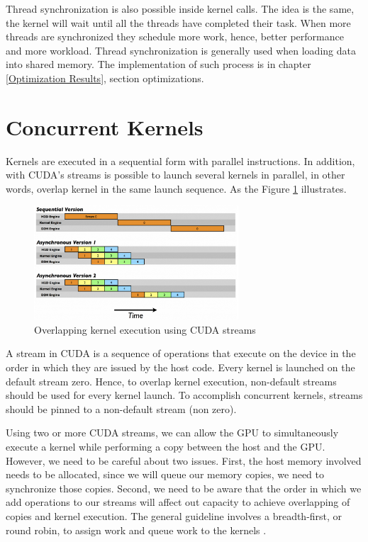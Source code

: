 Thread synchronization is also possible inside kernel calls. The idea is the same, the kernel will wait until all the threads have completed their task. When more threads are synchronized they schedule more work, hence, better performance and more workload. Thread synchronization is generally used when loading data into shared memory. The implementation of such process is in chapter \ref{Optimization Results}, section optimizations. 

\section{Concurrent Kernels}

Kernels are executed in a sequential form with parallel instructions. In addition, with CUDA's streams is possible to launch several kernels in parallel, in other words, overlap kernel in the same launch sequence. As the Figure \ref{fig:streams} illustrates.

\begin{figure}[htbp]
	\centering
		\includegraphics[width=0.68\textwidth]{Figures/streams.png}
		\smallskip
	\caption[Concurrent Kernels]{Overlapping kernel execution using CUDA streams}
	\label{fig:streams}
\end{figure}

A stream in CUDA is a sequence of operations that execute on the device in the order in which they are issued by the host code. Every kernel is launched on the default stream zero. Hence, to overlap kernel execution, non-default streams should be used for every kernel launch. To accomplish concurrent kernels, streams should be pinned to a non-default stream (non zero)\cite{hwu}. 

Using two or more CUDA streams, we can allow the GPU to simultaneously execute a kernel while performing a copy between the host and the GPU. However, we need to be careful about two issues. First, the host memory involved needs to be allocated, since we will queue our memory copies, we need to synchronize those copies. Second, we need to be aware that the order in which we add operations to our streams will affect out capacity to achieve overlapping of copies and kernel execution. The general guideline involves a breadth-first, or round robin, to assign work and queue work to the kernels \cite{example}.

